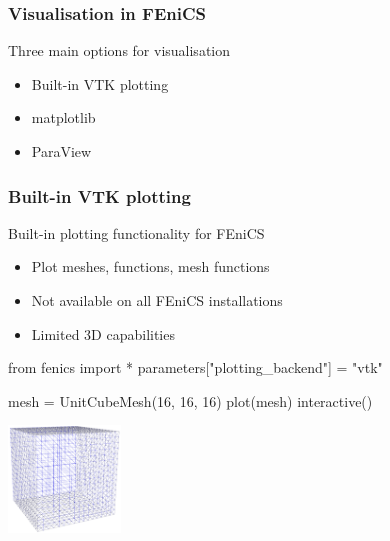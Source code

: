 \begin{frame}
  \frametitle{Visualisation in FEniCS}

   Three main options for visualisation

  \begin{itemize}

  \item
    Built-in VTK plotting
  \item
    matplotlib
  \item
    ParaView
  \end{itemize}

\end{frame}

\begin{frame}[fragile]
\frametitle{Built-in VTK plotting}

  Built-in plotting functionality for FEniCS

  \begin{itemize}

	\item Plot meshes, functions, mesh functions

	\item Not available on all FEniCS installations

	\item Limited 3D capabilities
  \end{itemize}
  \begin{python}
from fenics import *
parameters["plotting_backend"] = "vtk"

mesh = UnitCubeMesh(16, 16, 16)
plot(mesh)
interactive()
 \end{python}

  \begin{center}
    \includegraphics[width=3cm]{png/unitcube16.png}
  \end{center}


  \begin{python}

  \end{python}
\end{frame}

